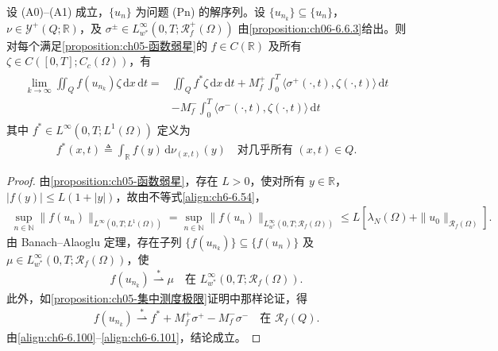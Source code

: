 \documentclass[../../main.tex]{subfiles}%
\begin{document}
\begin{proposition}\label{proposition:ch06-6.6.4}
设 (A0)--(A1) 成立，$\{u_n\}$ 为问题 (Pn) 的解序列。设 $\{u_{n_k}\}\subseteq\{u_n\}$，$\nu\in\mathcal{Y}^+(Q;\mathbb{R})$，及 $\sigma^\pm\in L^\infty_{w^*}(0,T;\mathscr{R}^+_f(\Omega))$ 由\cref{proposition:ch06-6.6.3}给出。则对每个满足\cref{proposition:ch05-函数弱星}的 $f\in C(\mathbb{R})$ 及所有 $\zeta\in C([0,T];C_c(\Omega))$，有
\begin{align}
\begin{aligned}
\lim_{k\to\infty}\iint_Q f(u_{n_k})\zeta\,\mathrm{d}x\,\mathrm{d}t
={}&\iint_Q f^*\zeta\,\mathrm{d}x\,\mathrm{d}t
+M^+_f\int_0^T\langle\sigma^+(\cdot,t),\zeta(\cdot,t)\rangle\,\mathrm{d}t\\
&-M^-_f\int_0^T\langle\sigma^-(\cdot,t),\zeta(\cdot,t)\rangle\,\mathrm{d}t
\end{aligned} \label{align:ch6-6.98}
\end{align}
其中 $f^*\in L^\infty(0,T;L^1(\Omega))$ 定义为
\begin{align}
f^*(x,t)\triangleq \int_\mathbb{R}f(y)\,\mathrm{d}\nu_{(x,t)}(y)
\quad\text{对几乎所有 }(x,t)\in Q. \label{align:ch6-6.99}
\end{align}
\end{proposition}

\begin{proof}
由\cref{proposition:ch05-函数弱星}，存在 $L>0$，使对所有 $y\in\mathbb{R}$，$|f(y)|\leqslant L(1+|y|)$，故由不等式\eqref{align:ch6-6.54}，
\begin{align*}
\sup_{n\in\mathbb{N}}\|f(u_n)\|_{L^\infty(0,T;L^1(\Omega))}
=\sup_{n\in\mathbb{N}}\|f(u_n)\|_{L^\infty_{w^*}(0,T;\mathscr{R}_f(\Omega))}
\leqslant L[\lambda_N(\Omega)+\|u_0\|_{\mathscr{R}_f(\Omega)}].
\end{align*}
由 Banach--Alaoglu 定理，存在子列 $\{f(u_{n_k})\}\subseteq\{f(u_n)\}$ 及 $\mu\in L^\infty_{w^*}(0,T;\mathscr{R}_f(\Omega))$，使
\begin{align}
f(u_{n_k})\stackrel{*}{\rightharpoonup}\mu
\quad\text{在 }L^\infty_{w^*}(0,T;\mathscr{R}_f(\Omega)). \label{align:ch6-6.100}
\end{align}
此外，如\cref{proposition:ch05-集中测度极限}证明中那样论证，得
\begin{align}
f(u_{n_k})\stackrel{*}{\rightharpoonup}f^*+M^+_f\sigma^+-M^-_f\sigma^-
\quad\text{在 }\mathscr{R}_f(Q). \label{align:ch6-6.101}
\end{align}
由\eqref{align:ch6-6.100}--\eqref{align:ch6-6.101}，结论成立。
\end{proof}
\end{document}
